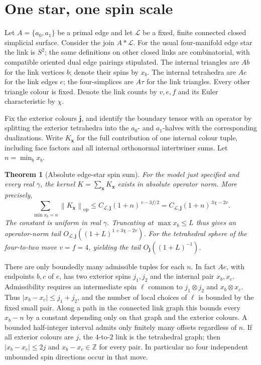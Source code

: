 \documentclass[11pt]{article}
\newtheorem{theorem}{Theorem}
\theoremstyle{remark}
\newcommand{\op}{\mathrm{op}}
\newcommand{\norm}[1]{\left\lVert #1\right\rVert}
\newcommand{\abs}[1]{\left|#1\right|}
\begin{document}
\section{One star, one spin scale}
Let \(A=\{a_0,a_1\}\) be a primal edge and let \(\mathcal L\) be a fixed, finite connected closed simplicial surface. Consider the join \(A*\mathcal L\). For the usual four-manifold edge star the link is \(S^2\); the same definitions on other closed links are combinatorial, with compatible oriented dual edge pairings stipulated. The internal triangles are \(A b\) for the link vertices \(b\); denote their spins by \(x_b\). The internal tetrahedra are \(A e\) for the link edges \(e\); the four-simplices are \(A\tau\) for the link triangles. Every other triangle colour is fixed. Denote the link counts by \(v,e,f\) and its Euler characteristic by \(\chi\).

Fix the exterior colours \(\boldsymbol j\), and identify the boundary tensor with an operator by splitting the exterior tetrahedra into the \(a_0\)- and \(a_1\)-halves with the corresponding dualizations. Write \(K_{\boldsymbol x}\) for the full contribution of one internal colour tuple, including face factors and all internal orthonormal intertwiner sums. Let \(n=\min_b x_b\).

\begin{theorem}[Absolute edge-star spin sum]\label{thm:all}
For the model just specified and every real \(\gamma\), the kernel \(K=\sum_{\boldsymbol x}K_{\boldsymbol x}\) exists in absolute operator norm. More precisely,
\[
 \sum_{\min x_b=n}\norm{K_{\boldsymbol x}}_{\op}
 \le C_{\mathcal L,\boldsymbol j}(1+n)^{\,v-3f/2}
 =C_{\mathcal L,\boldsymbol j}(1+n)^{\,3\chi-2v}.
\]
The constant is uniform in real \(\gamma\). Truncating at \(\max x_b\le L\) thus gives an operator-norm tail \(O_{\mathcal L,\boldsymbol j}((1+L)^{1+3\chi-2v})\). For the tetrahedral sphere of the four-to-two move \(v=f=4\), yielding the tail \(O_{\boldsymbol j}((1+L)^{-1})\).
\end{theorem}

There are only boundedly many admissible tuples for each \(n\). In fact \(Ae\), with endpoints \(b,c\) of \(e\), has two exterior spins \(j_1,j_2\) and the internal pair \(x_b,x_c\). Admissibility requires an intermediate spin \(\ell\) common to \(j_1\otimes j_2\) and \(x_b\otimes x_c\). Thus \(\abs{x_b-x_c}\le j_1+j_2\), and the number of local choices of \(\ell\) is bounded by the fixed small pair. Along a path in the connected link graph this bounds every \(x_b-n\) by a constant depending only on that graph and the exterior colours. A bounded half-integer interval admits only finitely many offsets regardless of \(n\). If all exterior colours are \(j\), the \(4\)-to-\(2\) link is the tetrahedral graph; then \(\abs{x_b-x_c}\le2j\) and \(x_b-x_c\in\mathbb Z\) for every pair. In particular no four independent unbounded spin directions occur in that move.
\end{document}
